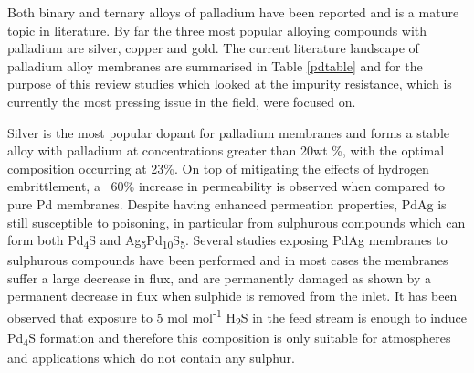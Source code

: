 Both binary and ternary alloys of palladium have been reported and is a mature topic in 
literature. By far the three most popular alloying compounds with palladium are silver, 
copper and gold. The current literature landscape of palladium alloy membranes are summarised 
in Table \ref{pdtable} and for the purpose of this review studies which looked at the impurity resistance, which 
is currently the most pressing issue in the field, were focused on. 

Silver is the most popular dopant for palladium membranes and forms a stable alloy with 
palladium at concentrations greater than 20wt \%, with the optimal composition occurring at 
23\%. On top of mitigating the effects of hydrogen embrittlement, a ~60\% increase in 
permeability is observed when compared to pure Pd membranes. Despite having enhanced 
permeation properties, PdAg is still susceptible to poisoning, in particular from sulphurous 
compounds which can form both Pd\textsubscript{4}S and Ag\textsubscript{5}Pd\textsubscript{10}S\textsubscript{5}. Several studies exposing PdAg membranes 
to sulphurous compounds have been performed and in most cases the membranes suffer a large 
decrease in flux, and are permanently damaged as shown by a permanent decrease in flux when 
sulphide is removed from the inlet. \cite{Mundschau2006} It has been observed that exposure to 5 \textmu mol mol\textsuperscript{-1} H\textsubscript{2}S 
in the feed stream is enough to induce Pd\textsubscript{4}S formation \cite{Mundschau2006} and therefore this composition is 
only suitable for atmospheres and applications which do not contain any sulphur. 

